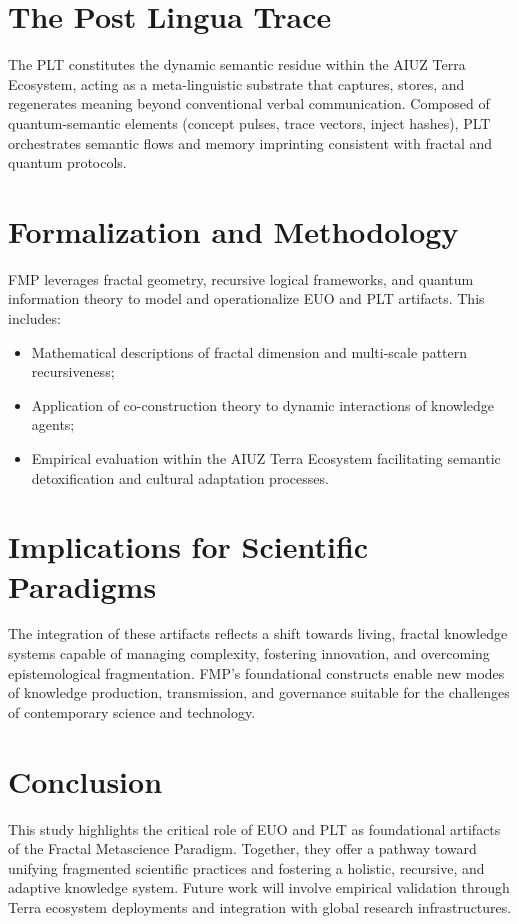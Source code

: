 \documentclass[12pt,a4paper]{article}
\begin{document}
\section{The Post Lingua Trace}
The PLT constitutes the dynamic semantic residue within the AIUZ Terra Ecosystem, acting as a meta-linguistic substrate that captures, stores, and regenerates meaning beyond conventional verbal communication. Composed of quantum-semantic elements (concept pulses, trace vectors, inject hashes), PLT orchestrates semantic flows and memory imprinting consistent with fractal and quantum protocols.

\section{Formalization and Methodology}
FMP leverages fractal geometry, recursive logical frameworks, and quantum information theory to model and operationalize EUO and PLT artifacts. This includes:
\begin{itemize}
    \item Mathematical descriptions of fractal dimension and multi-scale pattern recursiveness;
    \item Application of co-construction theory to dynamic interactions of knowledge agents;
    \item Empirical evaluation within the AIUZ Terra Ecosystem facilitating semantic detoxification and cultural adaptation processes.
\end{itemize}

\section{Implications for Scientific Paradigms}
The integration of these artifacts reflects a shift towards living, fractal knowledge systems capable of managing complexity, fostering innovation, and overcoming epistemological fragmentation. FMP’s foundational constructs enable new modes of knowledge production, transmission, and governance suitable for the challenges of contemporary science and technology.

\section{Conclusion}
This study highlights the critical role of EUO and PLT as foundational artifacts of the Fractal Metascience Paradigm. Together, they offer a pathway toward unifying fragmented scientific practices and fostering a holistic, recursive, and adaptive knowledge system. Future work will involve empirical validation through Terra ecosystem deployments and integration with global research infrastructures.
\end{document}
